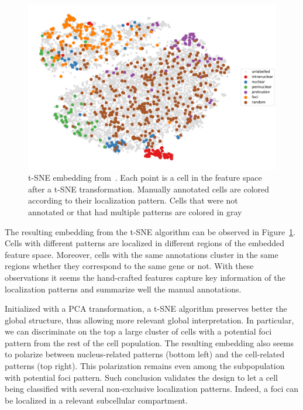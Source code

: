 \begin{figure}[]
    \centering
    \includegraphics[width=\textwidth]{figures/chapter5/tsne_annotation_legend}
    \caption{t-SNE embedding from~\cite{CHOUAIB_2020}.
	Each point is a cell in the feature space after a t-SNE transformation.
	Manually annotated cells are colored according to their localization pattern.
	Cells that were not annotated or that had multiple patterns are colored in gray}
    \label{fig:tsne_annotation_racha}
\end{figure}

The resulting embedding from the \ac{t-SNE} algorithm can be observed in Figure~\ref{fig:tsne_annotation_racha}.
Cells with different patterns are localized in different regions of the embedded feature space.
Moreover, cells with the same annotations cluster in the same regions whether they correspond to the same gene or not.
With these observations it seems the hand-crafted features capture key information of the localization patterns and summarize well the manual annotations.

Initialized with a PCA transformation, a \ac{t-SNE} algorithm preserves better the global structure, thus allowing more relevant global interpretation.
In particular, we can discriminate on the top a large cluster of cells with a potential foci pattern from the rest of the cell population.
The resulting embedding also seems to polarize between nucleus-related patterns (bottom left) and the cell-related patterns (top right).
This polarization remains even among the subpopulation with potential foci pattern.
Such conclusion validates the design to let a cell being classified with several non-exclusive localization patterns.
Indeed, a foci can be localized in a relevant subcellular compartment.

